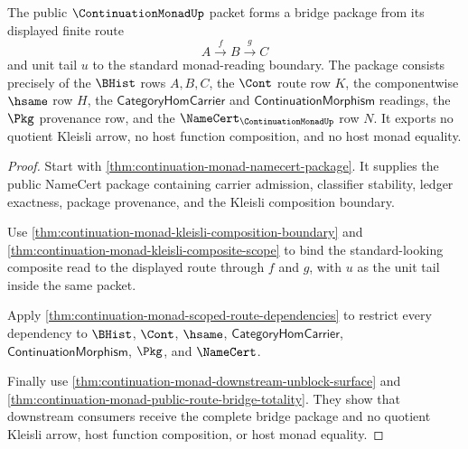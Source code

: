 \begin{theorem}
\label{thm:continuation-monad-bridge-package}
The public $\ContinuationMonadUp$ packet forms a bridge package from its displayed finite route
$$
A \xrightarrow{\,f\,} B \xrightarrow{\,g\,} C
$$
and unit tail $u$ to the standard monad-reading boundary. The package consists precisely of the $\BHist$ rows $A,B,C$, the $\Cont$ route row $K$, the componentwise $\hsame$ row $H$, the $\mathsf{CategoryHomCarrier}$ and $\mathsf{ContinuationMorphism}$ readings, the $\Pkg$ provenance row, and the $\NameCert_{\ContinuationMonadUp}$ row $N$. It exports no quotient Kleisli arrow, no host function composition, and no host monad equality.
\end{theorem}
\begin{proof}
Start with \autoref{thm:continuation-monad-namecert-package}. It supplies the public NameCert package containing carrier admission, classifier stability, ledger exactness, package provenance, and the Kleisli composition boundary.

Use \autoref{thm:continuation-monad-kleisli-composition-boundary} and \autoref{thm:continuation-monad-kleisli-composite-scope} to bind the standard-looking composite read to the displayed route through $f$ and $g$, with $u$ as the unit tail inside the same packet.

Apply \autoref{thm:continuation-monad-scoped-route-dependencies} to restrict every dependency to $\BHist$, $\Cont$, $\hsame$, $\mathsf{CategoryHomCarrier}$, $\mathsf{ContinuationMorphism}$, $\Pkg$, and $\NameCert$.

Finally use \autoref{thm:continuation-monad-downstream-unblock-surface} and \autoref{thm:continuation-monad-public-route-bridge-totality}. They show that downstream consumers receive the complete bridge package and no quotient Kleisli arrow, host function composition, or host monad equality.
\end{proof}

